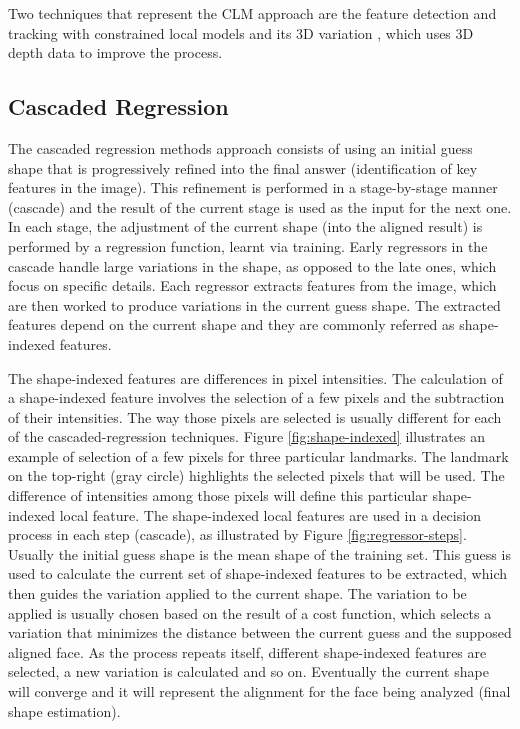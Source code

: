 Two techniques that represent the CLM approach are the feature detection and tracking with constrained local models \parencite{cristinacce2006feature} and its 3D variation \parencite{baltruvsaitis20123d}, which uses 3D depth data to improve the process.

\subsection{Cascaded Regression}

The cascaded regression methods approach consists of using an initial guess shape that is progressively refined into the final answer (identification of key features in the image). This refinement is performed in a stage-by-stage manner (cascade) and the result of the current stage is used as the input for the next one. In each stage, the adjustment of the current shape (into the aligned result) is performed by a regression function, learnt via training. Early regressors in the cascade handle large variations in the shape, as opposed to the late ones, which focus on specific details. Each regressor extracts features from the image, which are then worked to produce variations in the current guess shape. The extracted features depend on the current shape and they are commonly referred as shape-indexed features.

The shape-indexed features are differences in pixel intensities. The calculation of a shape-indexed feature involves the selection of a few pixels and the subtraction of their intensities. The way those pixels are selected is usually different for each of the cascaded-regression techniques. Figure \ref{fig:shape-indexed} illustrates an example of selection of a few pixels for three particular landmarks. The landmark on the top-right (gray circle) highlights the selected pixels that will be used. The difference of intensities among those pixels will define this particular shape-indexed local feature. The shape-indexed local features are used in a decision process in each step (cascade), as illustrated by Figure \ref{fig:regressor-steps}. Usually the initial guess shape is the mean shape of the training set. This guess is used to calculate the current set of shape-indexed features to be extracted, which then guides the variation applied to the current shape. The variation to be applied is usually chosen based on the result of a cost function, which selects a variation that minimizes the distance between the current guess and the supposed aligned face. As the process repeats itself, different shape-indexed features are selected, a new variation is calculated and so on. Eventually the current shape will converge and it will represent the alignment for the face being analyzed (final shape estimation).

